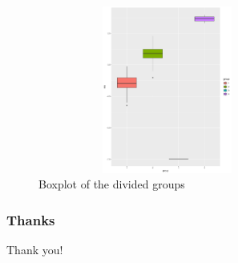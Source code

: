 \documentclass[cjk,10pt]{beamer}
\begin{document}
\begin{CJK*}{GBK}{song}
\begin{frame}
\begin{figure}[htbp]
\centering
\includegraphics[height=5.5cm, width=8.5cm]{Rplot-4}
\caption{Boxplot of the divided groups}
\end{figure}

\end{frame}

    \begin{frame}
    \frametitle{Thanks}
    Thank you!
    \end{frame}
\end{CJK*}
\end{document}
